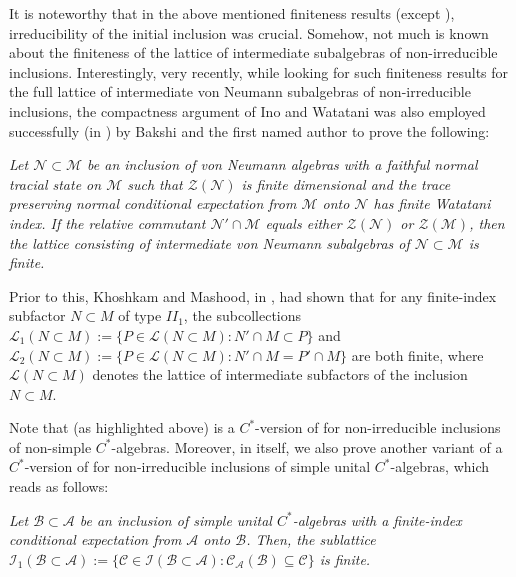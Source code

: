 \documentclass{amsart}
\numberwithin{equation}{section}
\newcommand{\mcal}{\mathcal}
\newcommand{\1}{\mathbf{1}}
\newcommand{\mA}{\mathcal{A}}
\newcommand{\mB}{\mathcal{B}}
\newcommand{\mC}{\mathcal{C}}
\newcommand{\mZ}{\mathcal{Z}}
\begin{document}
It is noteworthy that in the above mentioned finiteness results
(except ), irreducibility of the initial inclusion
was crucial. Somehow, not much is known about the finiteness of the
lattice of intermediate subalgebras of non-irreducible inclusions.
Interestingly, very recently, while looking for such finiteness
results for the full lattice of intermediate von Neumann subalgebras
of non-irreducible inclusions, the compactness argument of Ino and
Watatani was also employed successfully (in \cite{BG}) by Bakshi and
the first named author to prove the following:\smallskip

    \cite[Theorem 6.4]{BG} {\it Let
    $\mathcal{N} \subset \mathcal{M}$ be an inclusion of von Neumann
    algebras with a faithful normal tracial state on $\mathcal{M}$
    such that $\mZ(\mathcal{N})$ is finite dimensional and the trace
    preserving normal conditional expectation from $\mathcal{M}$ onto
    $\mathcal{N}$ has finite Watatani index. If the relative commutant
    $\mathcal{N}'\cap \mathcal{M}$ equals either $\mZ(\mathcal{N})$ or
    $\mZ(\mathcal{M})$, then the lattice  consisting of intermediate von Neumann
    subalgebras of $\mathcal{N} \subset \mathcal{M}$ is
    finite.}\smallskip

 Prior to this,  Khoshkam and Mashood, in \cite[Theorem 1.3]{KM}, had shown
 that for any finite-index subfactor $N \subset M$ of type $II_1$, the
 subcollections \( \mathcal{L}_1(N \subset M):=\{P \in \mathcal{L}(N
 \subset M) : N'\cap M \subset P\} \) and \( \mathcal{L}_2(N \subset
 M):=\{P \in \mathcal{L}(N \subset M) : N'\cap M = P'\cap M\} \) are
 both finite, where $\mathcal{L}(N \subset M)$ denotes the lattice of
 intermediate subfactors of the inclusion $N \subset M$.

   Note that  (as highlighted above) is a
   $C^*$-version of \cite[Theorem 1.3]{KM} for non-irreducible
   inclusions of non-simple $C^*$-algebras. Moreover, in
    itself, we also prove another variant of
   a $C^*$-version of \cite[Theorem 1.3]{KM} for non-irreducible
   inclusions of simple unital $C^*$-algebras, which reads as follows:\smallskip
  
   {\it Let $\mB \subset \mA $ be an
    inclusion of simple unital $C^{*}$-algebras with a finite-index
    conditional expectation from $\mA $ onto $\mB$. Then, the
    sublattice $\mcal{I}_1(\mB \subset \mA):=\{ \mC \in \mcal{I}(\mB
    \subset \mA) : \mC_{\mA}(\mB) \subseteq \mC\}$ is finite.
  }\smallskip
\end{document}
